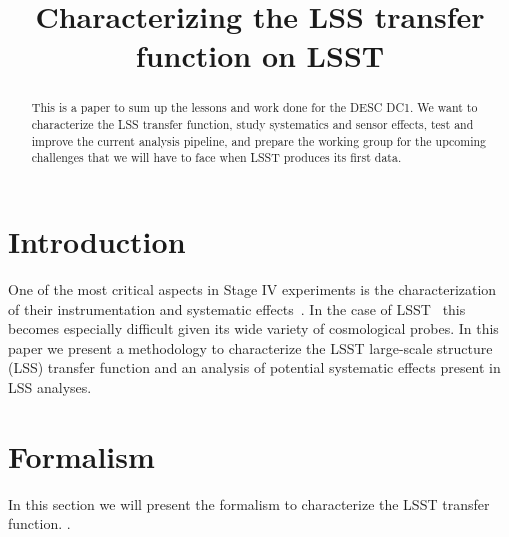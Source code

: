 \documentclass[\docopts]{\docclass}
\begin{document}
\title{ Characterizing the LSS transfer function on LSST }

\maketitlepre

\begin{abstract}

This is a paper to sum up the lessons and work done for the DESC DC1. We want to characterize the LSS transfer function, study systematics and sensor effects, test and improve the current analysis pipeline, and prepare the working group for the upcoming challenges that we will have to face when LSST produces its first data.

\end{abstract}


\maketitlepost

%

\section{Introduction}
\label{sec:intro}

One of the most critical aspects in Stage IV experiments is the characterization of their instrumentation and systematic effects~\citep{2006astro.ph..9591A}. In the case of  LSST~\citep{Overview,ScienceBook,WhitePaper} this becomes especially difficult given its wide variety of cosmological probes. In this paper we present a methodology to characterize the LSST large-scale structure (LSS) transfer function and an analysis of potential systematic effects present in LSS analyses.

\section{Formalism}

In this section we will present the formalism to characterize the LSST transfer function. .
\end{document}
